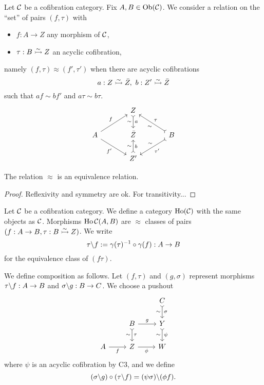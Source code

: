 \begin{construction}
Let $\mathcal{C}$ be a cofibration category. Fix $A,B\in\operatorname{Ob}(\mathcal{C})$. We consider a relation on the \enquote{set} of pairs $(f,\tau)$ with
\begin{itemize}
    \item $f:A\to Z$ any morphism of $\mathcal{C}$,
    \item $\tau:B\acco Z$ an acyclic cofibration,
\end{itemize}
namely $(f,\tau)\approx (f',\tau')$ when there are acyclic cofibrations
\[a:Z\acco\bar Z,\ b:Z'\acco\bar Z\]
such that $af\sim bf'$ and $a\tau\sim b\tau$.
\[
\begin{tikzcd}[column sep=large]
& Z \arrow[d, tail, "a", "\sim"']\\
A \arrow[dr, "f'", swap] \arrow[ur, "f"] & \bar{Z}  & B \arrow[ul, tail, "\tau"', "\sim" pos=0.45] \arrow[dl, tail, "\tau'" , "\sim"' pos=0.45]\\
 & Z' \arrow[u, "b"', "\sim", tail]
 \end{tikzcd}
\]
\end{construction}

\begin{proposition}
The relation $\approx$ is an equivalence relation.
\end{proposition}

\begin{proof}
Reflexivity and symmetry are ok. For transitivity...

\medskip
{}
\smallskip

\end{proof}

\begin{construction}
Let $\mathcal{C}$ be a cofibration category. We define a category $\operatorname{Ho}(\mathcal{C})$ with the same objects as $\mathcal{C}$. Morphisms $\operatorname{Ho}\mathcal{C}(A,B)$ are $\approx$ classes of pairs $(f:A\to B,\tau:B\acco Z)$. We write 
\[\tau\backslash f:=\gamma(\tau)^{-1}\circ\gamma(f):A\to B\]
for the equivalence class of $(f\tau)$.

We define composition as follows. Let $(f,\tau)$ and $(g,\sigma)$ represent morphisms $\tau\backslash f:A\to B$ and $\sigma\backslash g:B\to C$. We choose a pushout
\[
\begin{tikzcd}
 & & C \arrow[d, tail, "\sigma", "\sim"']\\
 & B \arrow[d, "\tau", "\sim"', tail] \arrow[r, "g"] & Y \arrow[d, tail, "\psi", "\sim"']\\
A \arrow[r, "f"'] & Z \arrow[r, "\phi"'] & W
\end{tikzcd}
\]
where $\psi$ is an acyclic cofibration by C3, and we define
\[(\sigma\bs g)\circ(\tau\bs f)=(\psi\sigma)\bs(\phi f).\]
\end{construction}

